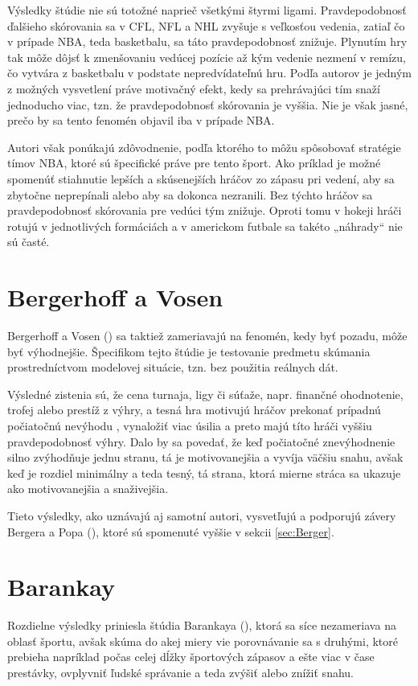 \documentclass[
  digital, %
  oneside, %
  notable,   %
  lof,     %
  lot,     %
]{fithesis3}
\begin{document}
		Výsledky štúdie nie sú totožné naprieč všetkými štyrmi ligami. Pravdepodobnosť ďalšieho skórovania sa v CFL, NFL a NHL zvyšuje s veľkosťou vedenia, zatiaľ čo v prípade NBA, teda basketbalu, sa táto pravdepodobnosť znižuje. Plynutím hry  tak môže dôjsť k zmenšovaniu vedúcej pozície až kým vedenie nezmení v remízu, čo vytvára z basketbalu v podstate nepredvídateľnú hru. Podľa autorov je jedným z možných vysvetlení práve motivačný efekt, kedy sa prehrávajúci tím snaží  jednoducho viac, tzn. že pravdepodobnosť skórovania je vyššia. Nie je však jasné, prečo by sa tento fenomén objavil iba v prípade NBA. \parencite[s.~18]{merritt2014}
	
		Autori však ponúkajú zdôvodnenie, podľa ktorého to môžu spôsobovať stratégie tímov NBA, ktoré sú špecifické práve pre tento šport. Ako príklad je možné spomenúť stiahnutie lepších a skúsenejších hráčov zo zápasu pri vedení, aby sa zbytočne neprepínali  alebo aby sa dokonca nezranili. Bez týchto hráčov sa pravdepodobnosť skórovania pre vedúci tým znižuje. Oproti tomu v hokeji hráči rotujú v jednotlivých formáciách a v americkom futbale sa takéto „náhrady“ nie sú časté. \parencite[s.~19]{merritt2014}
	
		\section{Bergerhoff a Vosen}
		Bergerhoff a Vosen (\citeyear{bergerhoff2015}) sa taktiež zameriavajú na fenomén, kedy byť pozadu, môže byť výhodnejšie. Špecifikom tejto štúdie je testovanie predmetu skúmania prostredníctvom modelovej situácie, tzn. bez použitia reálnych dát.
		
		Výsledné zistenia sú, že cena turnaja, ligy či súťaže, napr. finančné ohodnotenie, trofej alebo prestíž z výhry, a tesná hra motivujú hráčov prekonať prípadnú počiatočnú nevýhodu , vynaložiť viac úsilia a preto majú títo hráči vyššiu pravdepodobnosť výhry. \parencite[s.~20]{bergerhoff2015} Dalo by sa povedať, že keď počiatočné znevýhodnenie silno zvýhodňuje jednu stranu, tá je motivovanejšia a vyvíja väčšiu snahu, avšak keď je rozdiel minimálny a teda tesný, tá strana, ktorá mierne stráca sa ukazuje ako motivovanejšia a snaživejšia.
		
		Tieto výsledky, ako uznávajú aj samotní autori, vysvetľujú a podporujú závery Bergera a Popa (\citeyear{berger2011}), ktoré sú spomenuté vyššie v sekcii \ref{sec:Berger}.
		
		\section{Barankay}
		Rozdielne výsledky priniesla štúdia Barankaya (\citeyear{barankay2010}), ktorá sa síce nezameriava na oblasť športu, avšak skúma do akej miery vie porovnávanie sa s druhými, ktoré prebieha napríklad počas celej dĺžky športových zápasov a ešte viac v čase prestávky, ovplyvniť ľudské správanie a teda zvýšiť alebo znížiť snahu.
		
\end{document}
